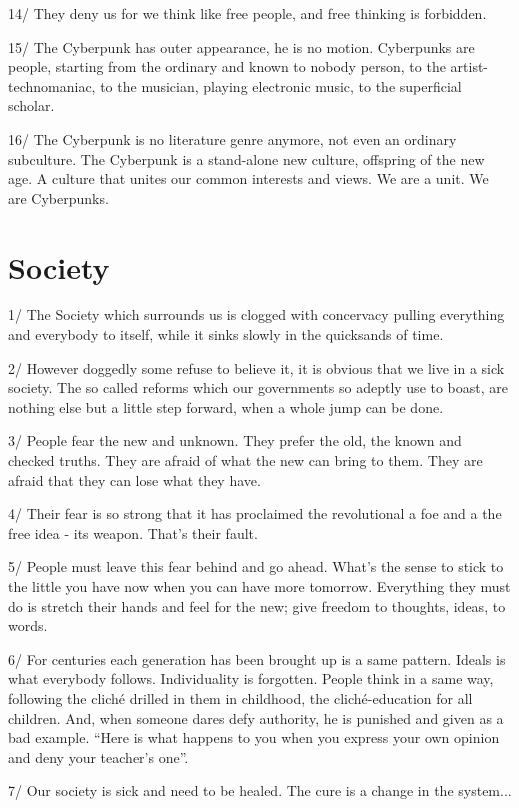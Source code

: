 \documentclass[letterpaper,12pt,english]{sphinxmanual}
\begin{document}
14/ They deny us for we think like free people, and free thinking is forbidden.

15/ The Cyberpunk has outer appearance, he is no motion. Cyberpunks are people, starting from the ordinary and known to nobody person, to the artist-technomaniac, to the musician, playing electronic music, to the superficial scholar.

16/ The Cyberpunk is no literature genre anymore, not even an ordinary subculture. The Cyberpunk is a stand-alone new culture, offspring of the new age. A culture that unites our common interests and views. We are a unit. We are Cyberpunks.


\section{Society}
\label{1997:society}
1/ The Society which surrounds us is clogged with concervacy pulling everything and everybody to itself, while it sinks slowly in the quicksands of time.

2/ However doggedly some refuse to believe it, it is obvious that we live in a sick society. The so called reforms which our governments so adeptly use to boast, are nothing else but a little step forward, when a whole jump can be done.

3/ People fear the new and unknown. They prefer the old, the known and checked truths. They are afraid of what the new can bring to them. They are afraid that they can lose what they have.

4/ Their fear is so strong that it has proclaimed the revolutional a foe and a the free idea - its weapon. That's their fault.

5/ People must leave this fear behind and go ahead. What's the sense to stick to the little you have now when you can have more tomorrow. Everything they must do is stretch their hands and feel for the new; give freedom to thoughts, ideas, to words.

6/ For centuries each generation has been brought up is a same pattern. Ideals is what everybody follows. Individuality is forgotten. People think in a same way, following the cliché drilled in them in childhood, the cliché-education for all children. And, when someone dares defy authority, he is punished and given as a bad example. ``Here is what happens to you when you express your own opinion and deny your teacher's one''.

7/ Our society is sick and need to be healed. The cure is a change in the system...
\end{document}
